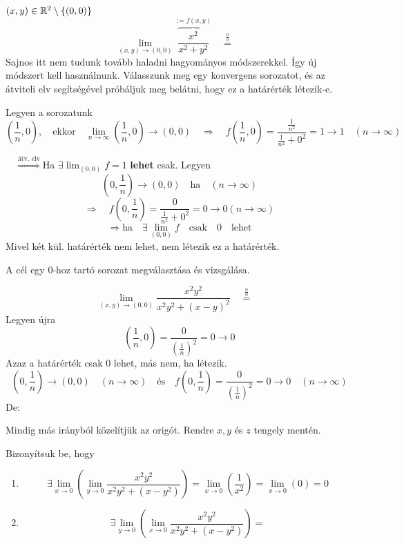 \documentclass[a4paper,11.5pt]{article}
\begin{document}
	\begin{task}$(x,y)\in\mathbb{R}^2\setminus\{(0,0)\}$
		\[ \lim_{(x,y)\to(0,0)}\overbrace{\frac{x^2}{x^2+y^2}}^{:=f(x,y)}\quad \overset{\frac{0}{0}}{=}\quad  \]
		Sajnos itt nem tudunk tovább haladni hagyományos módszerekkel. Így új módszert kell használnunk. Válasszunk meg egy konvergens sorozatot, és az átviteli elv segítségével próbáljuk meg belátni, hogy ez a határérték létezik-e.
		\smallskip
		
		Legyen a sorozatunk \[\left(\frac{1}{n},0\right),\quad \text{ekkor}\quad  \lim_{n\to\infty}\left(\frac{1}{n},0\right)\to(0,0)\quad \Rightarrow\quad f\left(\frac{1}{n},0\right)=\frac{\frac{1}{n^2}}{\frac{1}{n^2}+0^2}=1 \to1\quad (n\to\infty)\]
		
		$\quad \overset{\text{átv. elv}}{\Rightarrow}$\quad Ha $\exists\lim_{(0,0)}f=1$ \textbf{lehet} csak.
		Legyen 
		\[ \left(0,\frac{1}{n}\right)\to(0,0)\quad \text{ha}\quad (n\to\infty) \]
		\[ \Rightarrow\quad f\left(0,\frac{1}{n}\right)=\frac{0}{\frac{1}{n^2}+0^2}=0\to 0(n\to\infty) \]
		\[ \Rightarrow \text{ha}\quad \exists\lim_{(0,0)}f\quad \text{csak}\quad 0 \quad \text{lehet} \]
		Mivel két kül. határérték nem lehet, nem létezik ez a határérték.
	\end{task}
	\begin{note}
		A cél egy 0-hoz tartó sorozat megválasztása és vizsgálása.
	\end{note}
	\begin{task}
		\[ \lim_{(x,y)\to(0,0)}\frac{x^2y^2}{x^2y^2+(x-y)^2}\quad \overset{\frac{0}{0}}{=}\quad  \]
		Legyen újra
		\[ \left(\frac{1}{n},0\right)=\frac{0}{\left(\frac{1}{n}\right)^2}=0\to0 \]
		Azaz a határérték csak 0 lehet, más nem, ha létezik.
		\[ \left(0,\frac{1}{n}\right)\to(0,0)\quad (n\to\infty)\quad \text{és}\quad  f\left(0,\frac{1}{n}\right)=\frac{0}{\left(\frac{1}{n}\right)^2}=0\to 0\quad (n\to\infty) \]
		De:
	\end{task}
	\begin{note}
		Mindig más irányból közelítjük az origót. Rendre $x, y$ és $z$ tengely mentén.
	\end{note}
	\begin{exercise}
		Bizonyítsuk be, hogy
		\begin{enumerate}
			\item \[ \exists\lim_{x\to0}\left(\lim_{y\to0}\frac{x^2y^2}{x^2y^2+(x-y^2)}\right)=\lim_{x\to0}\left(\frac{1}{x^2}\right)=\lim_{x\to0}(0)=0 \]
			\item \[ \exists\lim_{y\to0}\left(\lim_{x\to0}\frac{x^2y^2}{x^2y^2+(x-y^2)}\right)= \]
		\end{enumerate}
	\end{exercise}
\end{document}
